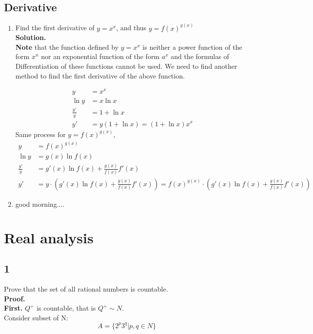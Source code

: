 \documentclass[11pt,a4paper]{article}
\begin{document}
\subsection{Derivative}
\begin{enumerate}

	\item Find the first derivative of $y=x^x$, and thus $y=f(x)^{g(x)}$
	\\\textbf{Solution.}
	\\\textbf{Note} that the function defined by $y = x^x$ is neither a power function of the form $x^n$ nor an exponential function of the form $a^x$ and the formulas of Differentiation of these functions cannot be used. We need to find another method to find the first derivative of the above function. 
	
	\begin{align*}
		y  &= x^x        \\
		\ln y &= x \ln x \\
	\frac{y'}{y} &= 1+\ln{x} \\
	y' &= y(1+\ln{x}) = (1+\ln{x})x^x
	\end{align*}
	Same process for  $y=f(x)^{g(x)}$,
	\begin{align*}
		y &= f(x)^{g(x)} \\
		\ln{y} &= g(x) \ln{f(x)} \\
		\frac{y'}{y} &= g'(x) \ln{f(x)} + \frac{g(x)}{f(x)} f'(x) \\
		y' &= y \cdot (g'(x) \ln{f(x)} + \frac{g(x)}{f(x)} f'(x) ) = f(x)^{g(x)} \cdot \left( g'(x) \ln{f(x)} + \frac{g(x)}{f(x)} f'(x) \right)
	\end{align*}
	\item good morning....
	
\end{enumerate}

\section{Real analysis}
\subsection{1}
Prove that the set of all rational numbers is countable.
\\\textbf{Proof.}
\\\textbf{First.} $Q^{+}$ is countable, that is $Q^{+} \sim N.$
\\Consider subset of N: 
$$ A=\{ 2^p3^q| p,q\in N\} $$
\end{document}
